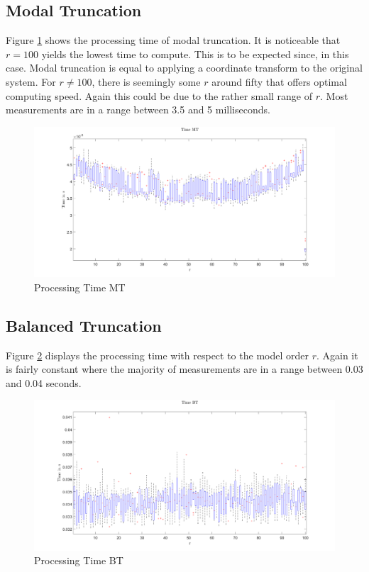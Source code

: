 \subsection{Modal Truncation}
Figure \ref{FIG-T-MT} shows the processing time of modal truncation.
It is noticeable that \(r = 100\) yields the lowest time to compute.
This is to be expected since, in this case. Modal truncation is equal to applying a coordinate transform to the original system.
For \(r \neq 100\), there is seemingly some \(r\) around fifty that offers optimal computing speed.
Again this could be due to the rather small range of  \(r\).
Most measurements are in a range between 3.5 and 5 milliseconds.
\begin{figure}[H]
\centering
\includegraphics[width=\textwidth]{images/time/MT}
\caption{Processing Time MT}
\label{FIG-T-MT}
\end{figure}

\subsection{Balanced Truncation}
Figure \ref{FIG-T-BT} displays the processing time with respect to the model order \(r\).
Again it is fairly constant where the majority of measurements are in a range between 0.03 and 0.04 seconds.
\begin{figure}[H]
\centering
\includegraphics[width=\textwidth]{images/time/BT}
\caption{Processing Time BT}
\label{FIG-T-BT}
\end{figure}

